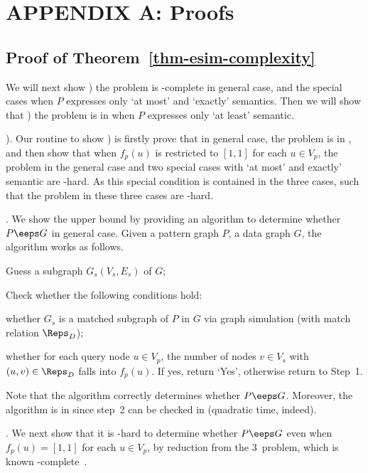 
\addtolength{\parskip}{0.25cm}
\newpage
\section*{{\Large \sf APPENDIX A: Proofs}}
\label{sec-app-proofs}

\subsection*{Proof of Theorem~\ref{thm-esim-complexity}}

We will next show  \uppercase\expandafter{}) the problem is \NP-complete in general case, and the special cases when $P$ expresses only `at most' and `exactly' semantics. Then we will show that  \uppercase\expandafter{}) the problem is in \PTIME when $P$ expresses only `at least' semantic.

\stab
\uppercase\expandafter{}). Our routine to show \uppercase\expandafter{}) is firstly prove that in general case, the problem is in \NP, and then show that when $f_p(u)$ is restricted to $[1,1]$ for each $u \in V_p$, the problem in the general case and two special cases with `at most' and exactly' semantic are \NP-hard. As this special condition is contained in the three cases, such that the problem in these three cases are \NP-hard.

.
We show the \NP upper bound by providing an \NP algorithm to determine whether $P \eeps G$ in
general case. Given a pattern graph $P$, a data graph $G$, the algorithm works as follows.
\be
\item Guess a subgraph $G_s(V_s,E_s)$ of $G$;
\item Check whether the following conditions hold:
\bi
\item [(a)] whether $G_s$ is a matched subgraph of $P$ in $G$ via graph simulation (with match relation $\Reps_D$);
\item [(b)] whether for each query node $u\in V_p$, the number of nodes $v\in V_s$ with $(u, v)\in \Reps_D$ falls into $f_p(u)$.
\ei
If yes, return `Yes', otherwise return to Step~1.
\ee

Note that the algorithm correctly determines whether $P \eeps G$. Moreover, the algorithm is in \NP since step~2 can be checked in \PTIME (quadratic time, indeed).

.
We next show that it is \NP-hard to determine whether $P \eeps G$ even when $f_p(u)=[1,1]$ for each $u \in V_p$, by reduction from the 3\SAT\ problem, which is known \NP-complete~\cite{}.

